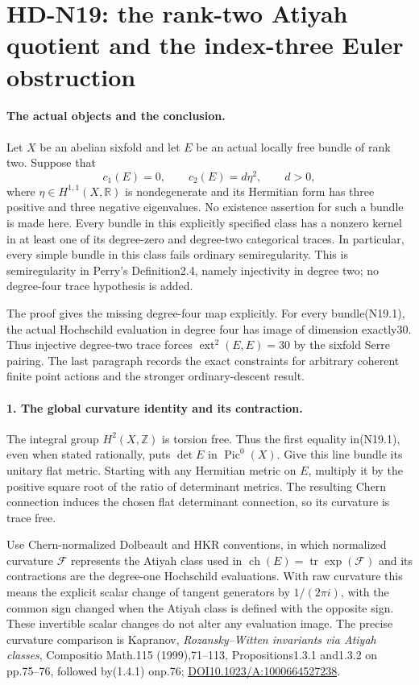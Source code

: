 \section{HD-N19: the rank-two Atiyah quotient and the index-three Euler obstruction}
\label{sec:rank-two-atiyah}

\paragraph{The actual objects and the conclusion.}
Let $X$ be an abelian sixfold and let $E$ be an actual locally free
bundle of rank two. Suppose that
\[
 c_1(E)=0,\qquad c_2(E)=d\eta^2,\qquad d>0,                 \tag{N19.1}
\]
where $\eta\in H^{1,1}(X,\mathbb R)$ is nondegenerate and its
Hermitian form has three positive and three negative eigenvalues.
No existence assertion for such a bundle is made here. Every bundle
in this explicitly specified class has a nonzero kernel in at least
one of its degree-zero and degree-two categorical traces. In particular,
every simple bundle in this class fails ordinary semiregularity.
This is semiregularity in Perry's Definition2.4, namely injectivity
in degree two; no degree-four trace hypothesis is added.

The proof gives the missing degree-four map explicitly. For every
bundle(N19.1), the actual Hochschild evaluation in degree four has
image of dimension exactly30. Thus injective degree-two trace forces
$\operatorname{ext}^2(E,E)=30$ by the sixfold Serre pairing.
The last paragraph records the exact constraints for arbitrary
coherent finite point actions and the stronger ordinary-descent result.

\paragraph{1. The global curvature identity and its contraction.}
The integral group $H^2(X,\mathbb Z)$ is torsion free. Thus the first
equality in(N19.1), even when stated rationally, puts $\det E$ in
$\operatorname{Pic}^0(X)$. Give this line bundle its unitary flat metric.
Starting with any Hermitian metric on $E$, multiply it by the positive
square root of the ratio of determinant metrics. The resulting Chern
connection induces the chosen flat determinant connection, so its
curvature is trace free.

Use Chern-normalized Dolbeault and HKR conventions, in which normalized
curvature $\mathcal F$ represents the Atiyah class used in
$\operatorname{ch}(E)=\operatorname{tr}\exp(\mathcal F)$ and its contractions
are the degree-one Hochschild evaluations. With raw curvature this
means the explicit scalar change of tangent generators by $1/(2\pi i)$,
with the common sign changed when the Atiyah class is defined with the
opposite sign. These invertible scalar changes do not alter any
evaluation image. The precise curvature comparison is Kapranov,
\emph{Rozansky--Witten invariants via Atiyah classes},
Compositio Math.115 (1999),71--113, Propositions1.3.1 and1.3.2
on pp.75--76, followed by(1.4.1) onp.76;
\href{https://doi.org/10.1023/A:1000664527238}
{DOI10.1023/A:1000664527238}.

